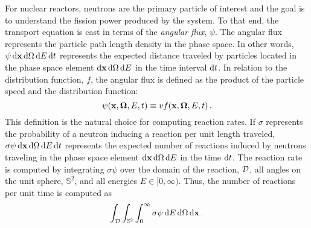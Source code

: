 \documentclass[../doc.tex]{subfiles}
\begin{document}
For nuclear reactors, neutrons are the primary particle of interest and the goal is to understand the fission power produced by the system. To that end, the transport equation is cast in terms of the \emph{angular flux}, $\psi$. The angular flux represents the particle path length density in the phase space. In other words, $\psi \mathop{}\!\mathrm{d} \boldsymbol{\mathrm{x}} \mathop{}\!\mathrm{d} \Omega \mathop{}\!\mathrm{d} E \mathop{}\!\mathrm{d} t$ represents the expected distance traveled by particles located in the phase space element $\mathop{}\!\mathrm{d} \boldsymbol{\mathrm{x}} \mathop{}\!\mathrm{d} \Omega\mathop{}\!\mathrm{d} E$ in the time interval $\mathop{}\!\mathrm{d} t$. In relation to the distribution function, $f$, the angular flux is defined as the product of the particle speed and the distribution function: 
	\begin{equation}
		\psi(\boldsymbol{\mathrm{x}},\boldsymbol{\Omega},E,t) \equiv v f(\boldsymbol{\mathrm{x}},\boldsymbol{\Omega},E,t) \,. 
	\end{equation}
This definition is the natural choice for computing reaction rates. If $\sigma$ represents the probability of a neutron inducing a reaction per unit length traveled, $\sigma \psi \mathop{}\!\mathrm{d} \boldsymbol{\mathrm{x}} \mathop{}\!\mathrm{d} \Omega\mathop{}\!\mathrm{d} E \mathop{}\!\mathrm{d} t$ represents the expected number of reactions induced by neutrons traveling in the phase space element $\mathop{}\!\mathrm{d}\boldsymbol{\mathrm{x}}\mathop{}\!\mathrm{d}\Omega\mathop{}\!\mathrm{d} E$ in the time $\mathop{}\!\mathrm{d} t$. The reaction rate is computed by integrating $\sigma \psi$ over the domain of the reaction, $\mathcal{D}$, all angles on the unit sphere, $\mathbb{S}^2$, and all energies $E \in [0,\infty)$. Thus, the number of reactions per unit time is computed as 
	\begin{equation}
		\int_{\mathcal{D}} \int_{\mathbb{S}^2} \int_0^\infty \sigma \psi \mathop{}\!\mathrm{d} E \mathop{}\!\mathrm{d} \Omega \mathop{}\!\mathrm{d} \boldsymbol{\mathrm{x}} \,. 
	\end{equation}
\end{document}
